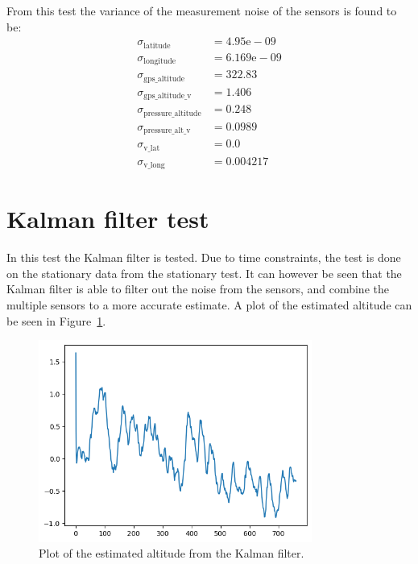 From this test the variance of the measurement noise of the sensors is found to be:
\begin{align}
    \sigma_{\text{latitude}} &= 4.95\mathrm{e}-09\nonumber\\
    \sigma_{\text{longitude}} &= 6.169\mathrm{e}-09\nonumber\\
    \sigma_{\text{gps\_altitude}} &= 322.83\nonumber \\
    \sigma_{\text{gps\_altitude\_v}} &= 1.406 \nonumber\\
    \sigma_{\text{pressure\_altitude}} &= 0.248 \nonumber\\
    \sigma_{\text{pressure\_alt\_v}} &= 0.0989\nonumber\\
    \sigma_{\text{v\_lat}} &= 0.0\nonumber\\
    \sigma_{\text{v\_long}} &= 0.004217 \nonumber
\end{align}


\section{Kalman filter test}\label{sec:kalman-filter-test}
In this test the Kalman filter is tested.
Due to time constraints, the test is done on the stationary data from the stationary test.
It can however be seen that the Kalman filter is able to filter out the noise from the sensors, and combine the multiple sensors to a more accurate estimate.
A plot of the estimated altitude can be seen in Figure~\ref{fig:kalman-filter-test}.

\begin{figure}[H]
    \centering
    \includegraphics[width=0.8\textwidth]{chapters/05Results/figures/filtered_alt_only}
    \caption{Plot of the estimated altitude from the Kalman filter.}
    \label{fig:kalman-filter-test}
\end{figure}

